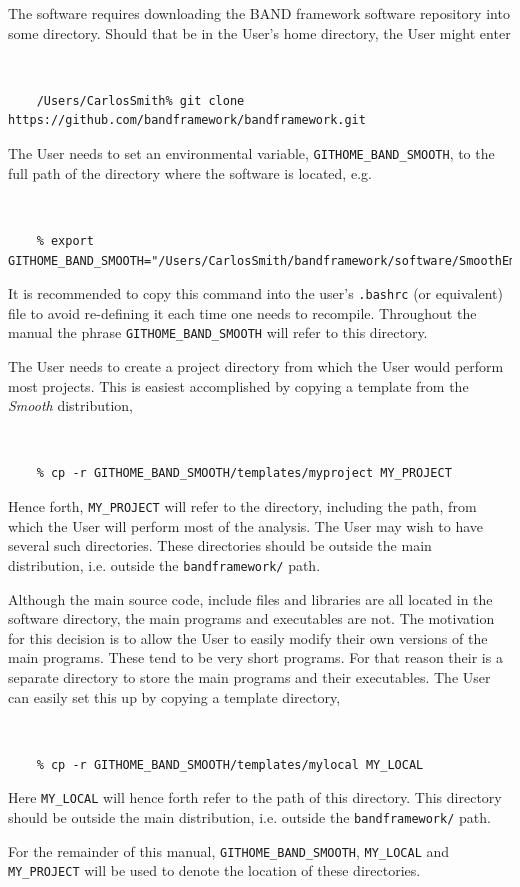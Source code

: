 \documentclass[UserManual.tex]{subfiles}
\begin{document}
The software requires downloading the BAND framework software repository into some directory. Should that be in the User's home directory, the User might enter
{\tt 
\begin{verbatim}
    /Users/CarlosSmith% git clone https://github.com/bandframework/bandframework.git
\end{verbatim}
}
The User needs to set an environmental variable, {\tt GITHOME\_BAND\_SMOOTH}, to the full path of the directory where the software is located, e.g. 
{\tt
\begin{verbatim}
    % export GITHOME_BAND_SMOOTH="/Users/CarlosSmith/bandframework/software/SmoothEmulator"
\end{verbatim}
}
It is recommended to copy this command into the user's {\tt .bashrc} (or equivalent) file to avoid re-defining it each time one needs to recompile. Throughout the manual the phrase {\tt GITHOME\_BAND\_SMOOTH} will refer to this directory. 

The User needs to create a project directory from which the User would perform most projects. This is easiest accomplished by copying a template from the {\it Smooth} distribution,
{\tt
\begin{verbatim}
    % cp -r GITHOME_BAND_SMOOTH/templates/myproject MY_PROJECT
\end{verbatim}
}
Hence forth, {\tt MY\_PROJECT} will refer to the directory, including the path, from which the User will perform most of the analysis. The User may wish to have several such directories. These directories should be outside the main distribution, i.e. outside the {\tt bandframework/} path. 

Although the main source code, include files and libraries are all located in the software directory, the main programs and executables are not. The motivation for this decision is to allow the User to easily modify their own versions of the main programs. These tend to be very short programs. For that reason their is a separate directory to store the main programs and their executables. The User can easily set this up by copying a template directory,
{\tt 
\begin{verbatim}
    % cp -r GITHOME_BAND_SMOOTH/templates/mylocal MY_LOCAL
\end{verbatim}
}
Here {\tt MY\_LOCAL} will hence forth refer to the path of this directory. This directory should be outside the main distribution, i.e. outside the {\tt bandframework/} path. 

For the remainder of this manual, {\tt GITHOME\_BAND\_SMOOTH}, {\tt MY\_LOCAL} and {\tt MY\_PROJECT} will be used to denote the location of these directories.
\end{document}
